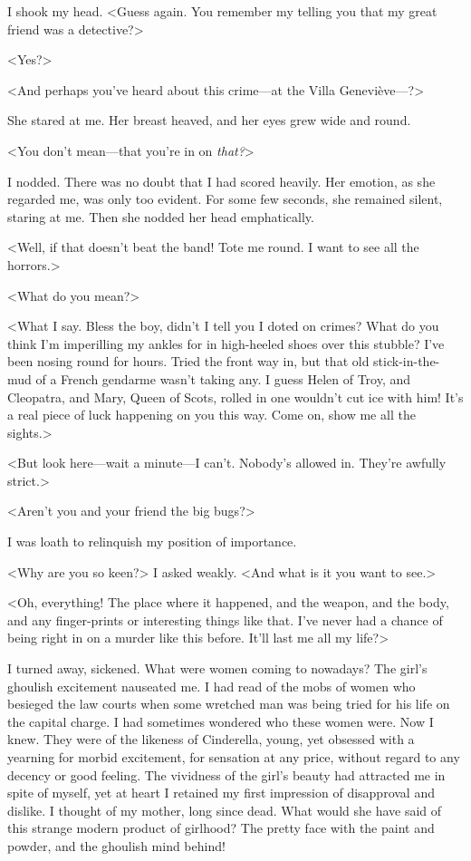  I shook my head. <Guess again. You remember my telling you that my great friend was a detective?> 

 <Yes?> 

 <And perhaps you've heard about this crime—at the Villa Geneviève—?> 

 She stared at me. Her breast heaved, and her eyes grew wide and round. 

 <You don't mean—that you're in on \emph{that?}> 

 I nodded. There was no doubt that I had scored heavily. Her emotion, as she regarded me, was only too evident. For some few seconds, she remained silent, staring at me. Then she nodded her head emphatically. 

 <Well, if that doesn't beat the band! Tote me round. I want to see all the horrors.> 

 <What do you mean?> 

 <What I say. Bless the boy, didn't I tell you I doted on crimes? What do you think I'm imperilling my ankles for in high-heeled shoes over this stubble? I've been nosing round for hours. Tried the front way in, but that old stick-in-the-mud of a French gendarme wasn't taking any. I guess Helen of Troy, and Cleopatra, and Mary, Queen of Scots, rolled in one wouldn't cut ice with him! It's a real piece of luck happening on you this way. Come on, show me all the sights.> 

 <But look here—wait a minute—I can't. Nobody's allowed in. They're awfully strict.> 

 <Aren't you and your friend the big bugs?> 

 I was loath to relinquish my position of importance. 

 <Why are you so keen?> I asked weakly. <And what is it you want to see.> 

 <Oh, everything! The place where it happened, and the weapon, and the body, and any finger-prints or interesting things like that. I've never had a chance of being right in on a murder like this before. It'll last me all my life?> 

 I turned away, sickened. What were women coming to nowadays? The girl's ghoulish excitement nauseated me. I had read of the mobs of women who besieged the law courts when some wretched man was being tried for his life on the capital charge. I had sometimes wondered who these women were. Now I knew. They were of the likeness of Cinderella, young, yet obsessed with a yearning for morbid excitement, for sensation at any price, without regard to any decency or good feeling. The vividness of the girl's beauty had attracted me in spite of myself, yet at heart I retained my first impression of disapproval and dislike. I thought of my mother, long since dead. What would she have said of this strange modern product of girlhood? The pretty face with the paint and powder, and the ghoulish mind behind! 

